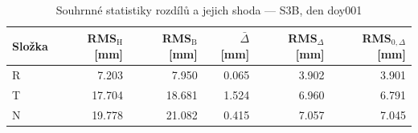 \begin{table}[H]
\centering
\caption{Souhrnné statistiky rozdílů a jejich shoda — S3B, den doy001}
\label{tab:hermite_vs_bernese_s3b_doy001_summary}
\begin{tabular}{lrrrrr}
\toprule
Složka & RMS$_\mathrm{H}$ [mm] & RMS$_\mathrm{B}$ [mm] & $\bar{\Delta}$ [mm] & RMS$_{\Delta}$ [mm] & RMS$_{0,\Delta}$ [mm] \\
\midrule
R & 7.203 & 7.950 & 0.065 & 3.902 & 3.901 \\
T & 17.704 & 18.681 & 1.524 & 6.960 & 6.791 \\
N & 19.778 & 21.082 & 0.415 & 7.057 & 7.045 \\
\bottomrule
\end{tabular}
\end{table}
